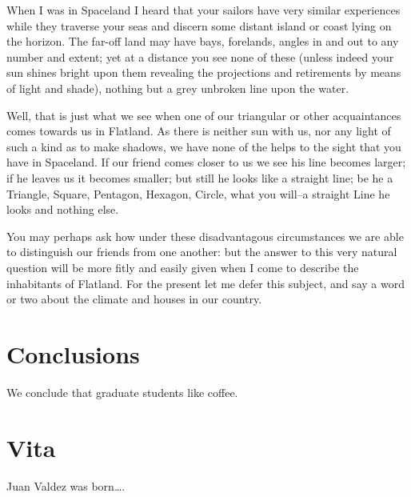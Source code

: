 \documentclass[edeposit,fullpage]{uiucthesis2014}
\begin{document}
When I was in Spaceland I heard that your sailors have very similar
experiences while they traverse your seas and discern some distant
island or coast lying on the horizon.  The far-off land may have bays,
forelands, angles in and out to any number and extent; yet at a
distance you see none of these (unless indeed your sun shines bright
upon them revealing the projections and retirements by means of light
and shade), nothing but a grey unbroken line upon the water.

Well, that is just what we see when one of our triangular or other
acquaintances comes towards us in Flatland.  As there is neither sun
with us, nor any light of such a kind as to make shadows, we have none
of the helps to the sight that you have in Spaceland.  If our friend
comes closer to us we see his line becomes larger; if he leaves us it
becomes smaller; but still he looks like a straight line; be he a
Triangle, Square, Pentagon, Hexagon, Circle, what you will--a straight
Line he looks and nothing else.

You may perhaps ask how under these disadvantagous circumstances we are
able to distinguish our friends from one another: but the answer to
this very natural question will be more fitly and easily given when I
come to describe the inhabitants of Flatland.  For the present let me
defer this subject, and say a word or two about the climate and houses
in our country.






\chapter{Conclusions}

We conclude that graduate students like coffee.

\appendix*



\backmatter



\chapter{Vita}

Juan Valdez was born\ldots.
\end{document}
